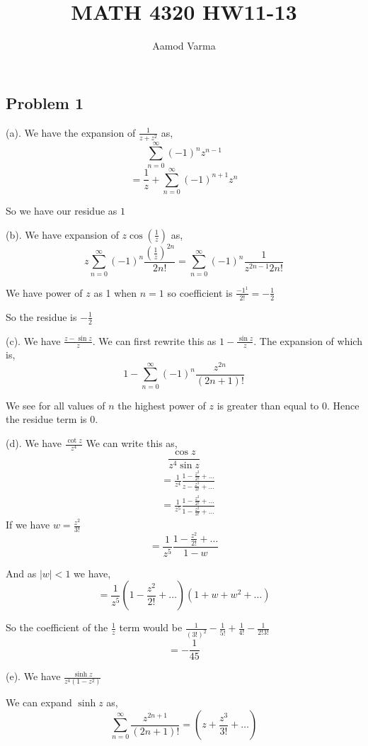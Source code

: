 \documentclass[a4paper]{report}
\title{MATH 4320 HW11-13}
\author{Aamod Varma}
\begin{document}
\maketitle

\subsection*{Problem 1}
(a). We have the expansion of $\frac{1}{z + z^2}$ as, 
$$ \sum_{n=0}^{\infty} (-1)^{n} z^{n - 1} $$ 
$$ = \frac{1}{z} + \sum_{n=0}^{\infty} (-1)^{n+1} z^{n} $$ 

So we have our residue as $1$ 

(b). We have expansion of $z \cos(\frac{1}{z})$ as, 
$$ z \sum_{n=0}^{\infty} (-1)^{n}\frac{(\frac{1}{z})^{2n}}{2n!} = \sum_{n=0}^{\infty} (-1)^{n} \frac{1}{z^{2n - 1} 2n!} $$ 

We have power of $z$ as 1 when $n = 1$ so coefficient is $\frac{-1^{1}}{2!} = -\frac{1}{2}$ 

So the residue is $-\frac{1}{2}$ 

(c). We have $\frac{z - \sin z}{z}$. We can first rewrite this as $1 - \frac{\sin z}{z}$. The expansion of which is, 
$$ 1 - \sum_{n=0}^{\infty} (-1)^{n} \frac{z^{2n}}{(2n + 1)!} $$ 

We see for all values of $n$ the highest power of $z$ is greater than equal to $0$. Hence the residue term is $0$.

(d). We have $\frac{\cot z}{z^{4}}$
We can write this as, 
$$ \frac{\cos z}{z^{4} \sin z} $$ 
\begin{align*}
    &= \frac{1}{z^{4}} \frac{1 - \frac{z^{2}}{2!} + \dots}{z - \frac{z^{3}}{3!} + \dots}\\
    &=\frac{1}{z^{5}} \frac{1 - \frac{z^{2}}{2!} + \dots}{1 - \frac{z^{2}}{3!} + \dots}
\end{align*}
If we have $w = \frac{z^{2}}{3!}$ 
$$
    =\frac{1}{z^{5}} \frac{1 - \frac{z^{2}}{2!} + \dots}{1 - w}
    $$


    And as $|w| < 1$ we have, 
    $$=\frac{1}{z^{5}} (1 - \frac{z^{2}}{2!} + \dots )(1 + w + w^2 +\dots)$$


    So the coefficient of the $\frac{1}{z}$ term would be $\frac{1}{(3!)^2} - \frac{1}{5!} + \frac{1}{4!} - \frac{1}{2!3!}$ 
    $$ = -\frac{1}{45} $$ 



    (e). We have $\frac{\sinh z}{z^{4}(1 - z^2)}$ 

    We can expand $\sinh z$ as, 
    $$ \sum_{n=0}^{\infty} \frac{z^{2n + 1}}{(2n + 1)!} = (z + \frac{z^{3}}{3!} + \dots) $$ 
\end{document}

